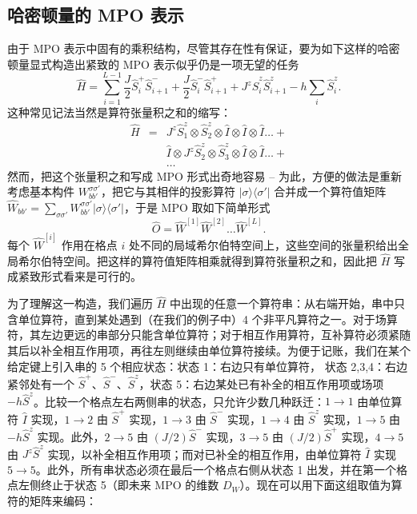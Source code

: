 \documentclass[a4paper,10pt,oneside,onecolumn,1p,times]{elsarticle}
\newcommand{\bra}[1]{\mbox{$\langle #1  |$}}
\newcommand{\ket}[1]{\mbox{$| #1  \rangle$}}
\begin{document}
\subsection{哈密顿量的 MPO 表示}
由于 MPO 表示中固有的乘积结构，尽管其存在性有保证，要为如下这样的哈密顿量显式构造出紧致的 MPO 表示似乎仍是一项无望的任务
\begin{equation}
\hat{H} = \sum_{i=1}^{L-1} \frac{J}{2}\hat{S}^+_i \hat{S}^-_{i+1} + \frac{J}{2}\hat{S}^-_i \hat{S}^+_{i+1} + J^z \hat{S}^z_i \hat{S}^z_{i+1} - h\sum_{i} \hat{S}^z_i .
\end{equation}
这种常见记法当然是算符张量积之和的缩写：
\begin{eqnarray*}
\hat{H} &=& J^z\hat{S}^z_1 \otimes \hat{S}^z_2 \otimes \hat{I} \otimes \hat{I} \otimes \hat{I} \ldots + \\
 & & \hat{I} \otimes J^z\hat{S}^z_2 \otimes \hat{S}^z_3 \otimes \hat{I} \otimes \hat{I} \ldots + \\
 & & \ldots
 \end{eqnarray*}
然而，把这个张量积之和写成 MPO 形式出奇地容易 \cite{McCulloch07} -- 为此，方便的做法是重新考虑基本构件 $W^{\sigma\sigma'}_{bb'}$，把它与其相伴的投影算符 $\ket{\sigma}\bra{\sigma'}$ 合并成一个算符值矩阵 $\hat{W}_{bb'} = \sum_{\sigma\sigma'} W^{\sigma\sigma'}_{bb'} \ket{\sigma}\bra{\sigma'}$，于是 MPO 取如下简单形式
\begin{equation}
\hat{O} = \hat{W}^{[1]}\hat{W}^{[2]} \ldots \hat{W}^{[L]} .
\end{equation}
每个 $\hat{W}^{[i]}$ 作用在格点 $i$ 处不同的局域希尔伯特空间上，这些空间的张量积给出全局希尔伯特空间。把这样的算符值矩阵相乘就得到算符张量积之和，因此把 $\hat{H}$ 写成紧致形式看来是可行的。

为了理解这一构造，我们遍历 $\hat{H}$ 中出现的任意一个算符串：从右端开始，串中只含单位算符，直到某处遇到（在我们的例子中）4 个非平凡算符之一。对于场算符，其左边更远的串部分只能含单位算符；对于相互作用算符，互补算符必须紧随其后以补全相互作用项，再往左则继续由单位算符接续。为便于记账，我们在某个给定键上引入串的 5 个相应状态：状态 1：右边只有单位算符，
状态 2,3,4：右边紧邻处有一个 $\hat{S}^+$、$\hat{S}^-$、$\hat{S}^z$，状态 5：右边某处已有补全的相互作用项或场项 $-h\hat{S}^z$。比较一个格点左右两侧串的状态，只允许少数几种跃迁：$1 \rightarrow 1$ 由单位算符 $\hat{I}$ 实现，$1 \rightarrow 2$ 由 $\hat{S}^+$ 实现，$1 \rightarrow 3$ 由 $\hat{S}^-$ 实现，$1 \rightarrow 4$ 由 $\hat{S}^z$ 实现，$1 \rightarrow 5$ 由 $-h\hat{S}^z$ 实现。此外，$2\rightarrow 5$ 由 $(J/2)\hat{S}^-$ 实现，$3 \rightarrow 5$ 由 $(J/2)\hat{S}^+$ 实现，$4 \rightarrow 5$ 由 $J^z\hat{S}^z$ 实现，以补全相互作用项；而对已补全的相互作用，由单位算符 $\hat{I}$ 实现 $5 \rightarrow 5$。此外，所有串状态必须在最后一个格点右侧从状态 1 出发，并在第一个格点左侧终止于状态 5（即未来 MPO 的维数 $D_W$）。现在可以用下面这组取值为算符的矩阵来编码：
\end{document}
